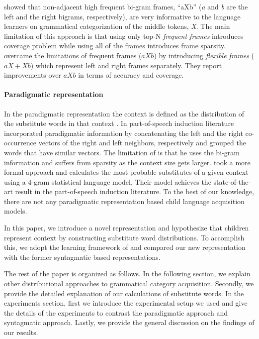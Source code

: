 \cite{Mintz200391} showed that non-adjacent high frequent bi-gram frames,
``aXb'' ({\it a} and {\it b} are the left and the right bigrams, respectively),
are very informative to the language learners on grammatical categorization of
the middle tokens, {\it X}.  The main limitation of this approach is that using
only top-N {\it frequent frames} introduces coverage problem while using all of
the frames introduces frame sparsity.  \cite{clair2010} overcame the
limitations of frequent frames ($aXb$) by introducing {\it flexible frames}
($aX+Xb$) which represent left and right frames separately.  They report
improvements over $aXb$ in terms of accuracy and coverage.  

\paragraph {Paradigmatic representation}

In the paradigmatic representation the context is defined as the distribution
of the substitute words in that context \citep*{SchutzePe93, Schutze1995,
YatbazSY12}.   In part-of-speech induction literature \cite{Schutze1995}
incorporated paradigmatic information by concatenating the left and the right
co-occurrence vectors of the right and left neighbors, respectively and grouped
the words that have similar vectors.  The limitation of \cite{Schutze1995} is
that he uses the bi-gram information and suffers from sparsity as the context
size gets larger.  \cite{YatbazSY12} took a more formal approach and
calculates the most probable substitutes of a given context using a 4-gram
statistical language model.  Their model achieves the state-of-the-art result
in the part-of-speech induction literature.  To the best of our knowledge,
there are not any paradigmatic representation based child language acquisition
models.  

In this paper, we introduce a novel representation and hypothesize that
children represent context by constructing substitute word distributions.  To
accomplish this, we adopt the learning framework of \citep*{clair2010} and
compared our new representation with the former syntagmatic based
representations. 

The rest of the paper is organized as follows. In the following section, we explain other
distributional approaches to grammatical category acquisition. Secondly, we provide
the detailed explanation of our calculations of substitute words. In the experiments section,
first we introduce the experimental setup we used and give the details of the experiments
to contrast the paradigmatic approach and syntagmatic approach. Lastly, we provide the
general discussion on the findings of our results. 
